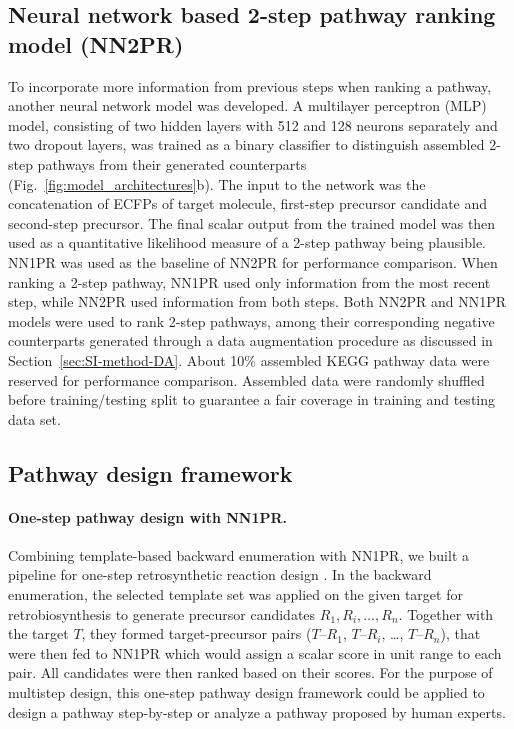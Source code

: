 \documentclass{article}
\begin{document}
\subsection{Neural network based 2-step pathway ranking model (NN2PR)}

To incorporate more information from previous steps when ranking a pathway, another neural network model was developed.
A multilayer perceptron (MLP) model, consisting of two hidden layers with 512 and 128 neurons separately and two dropout layers, was trained as a binary classifier to distinguish assembled 2-step pathways from their generated counterparts (Fig.~\ref{fig:model_architectures}b). 
The input to the network was the concatenation of ECFPs of target molecule, first-step precursor candidate and second-step precursor. 
The final scalar output from the trained model was then used as a quantitative likelihood measure of a 2-step pathway being plausible.
NN1PR was used as the baseline of NN2PR for performance comparison. 
When ranking a 2-step pathway, NN1PR used only information from the most recent step, while NN2PR used information from both steps. 
Both NN2PR and NN1PR models were used to rank 2-step pathways, among their corresponding negative counterparts generated through a data augmentation procedure as discussed in Section~\ref{sec:SI-method-DA}. 
About 10\% assembled KEGG pathway data were reserved for performance comparison. Assembled data were randomly shuffled before training/testing split to guarantee a fair coverage in training and testing data set.


\subsection{Pathway design framework}
\paragraph{One-step pathway design with NN1PR.}
Combining template-based backward enumeration with NN1PR, we built a pipeline for one-step retrosynthetic reaction design \citep{coley2017computer}.
In the backward enumeration, the selected template set was applied on the given target for retrobiosynthesis to generate precursor candidates $R_1, R_i, \ldots, R_n$.
Together with the target $T$, they formed target-precursor pairs ($T$--$R_1$, $T$--$R_i$, \ldots, $T$--$R_n$), that were then fed to NN1PR which would assign a scalar score in unit range to each pair.
All candidates were then ranked based on their scores.
For the purpose of multistep design, this one-step pathway design framework could be applied to design a pathway step-by-step or analyze a pathway proposed by human experts. 
\end{document}
